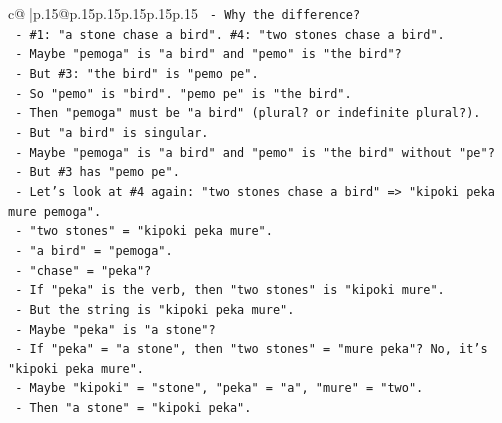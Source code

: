\documentclass{article}
\begin{document}
{\begin{supertabular}{c@{$\;$}|p{.15\linewidth}@{}p{.15\linewidth}p{.15\linewidth}p{.15\linewidth}p{.15\linewidth}p{.15\linewidth}}
{{{\texttt{                                      {-} Why the difference?} \\
\texttt{                                      {-} \#1: "a stone chase a bird". \#4: "two stones chase a bird".} \\
\texttt{                                      {-} Maybe "pemoga" is "a bird" and "pemo" is "the bird"?} \\
\texttt{                                      {-} But \#3: "the bird" is "pemo pe".} \\
\texttt{                                      {-} So "pemo" is "bird". "pemo pe" is "the bird".} \\
\texttt{                                      {-} Then "pemoga" must be "a bird" (plural? or indefinite plural?).} \\
\texttt{                                      {-} But "a bird" is singular.} \\
\texttt{                                      {-} Maybe "pemoga" is "a bird" and "pemo" is "the bird" without "pe"?} \\
\texttt{                                      {-} But \#3 has "pemo pe".} \\
\texttt{                                      {-} Let's look at \#4 again: "two stones chase a bird" => "kipoki peka mure pemoga".} \\
\texttt{                                        {-} "two stones" = "kipoki peka mure".} \\
\texttt{                                        {-} "a bird" = "pemoga".} \\
\texttt{                                        {-} "chase" = "peka"?} \\
\texttt{                                        {-} If "peka" is the verb, then "two stones" is "kipoki mure".} \\
\texttt{                                        {-} But the string is "kipoki peka mure".} \\
\texttt{                                        {-} Maybe "peka" is "a stone"?} \\
\texttt{                                        {-} If "peka" = "a stone", then "two stones" = "mure peka"? No, it's "kipoki peka mure".} \\
\texttt{                                        {-} Maybe "kipoki" = "stone", "peka" = "a", "mure" = "two".} \\
\texttt{                                        {-} Then "a stone" = "kipoki peka".} \\
}}}
\end{supertabular}}
\end{document}
